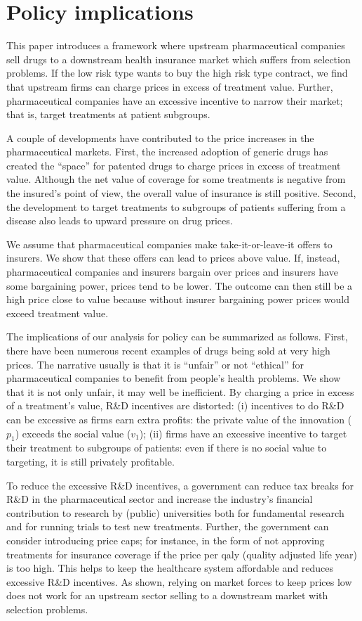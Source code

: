 \documentclass[a4paper,12pt]{article}
\begin{document}
\section{Policy implications}
\label{sec:orgf141759}

This paper introduces a framework where upstream pharmaceutical companies sell drugs to a downstream health insurance market which suffers from selection problems. If the low risk type wants to buy the high risk type contract, we find that upstream firms can charge prices in excess of treatment value. Further, pharmaceutical companies have an excessive incentive to narrow their market; that is, target treatments at patient subgroups.

A couple of developments have contributed to the price increases in the pharmaceutical markets. First, the increased adoption of generic drugs has created the ``space'' for patented drugs to charge prices in excess of treatment value. Although the net value of coverage for some treatments is negative from the insured's point of view, the overall value of insurance is still positive. Second, the development to target treatments to subgroups of patients suffering from a disease also leads to upward pressure on drug prices. 

We assume that pharmaceutical companies make take-it-or-leave-it offers to insurers. We show that these offers can lead to prices above value. If, instead, pharmaceutical companies and insurers bargain over prices and insurers have some bargaining power, prices tend to be lower. The outcome can then still be a high price close to value because without insurer bargaining power prices would exceed treatment value.

The implications of our analysis for policy can be summarized as follows. First, there have been numerous recent examples of drugs being sold at very high prices. The narrative usually is that it is ``unfair'' or not ``ethical'' for pharmaceutical companies to benefit from people's health problems. We show that it is not only unfair, it may well be inefficient. By charging a price in excess of a treatment's value, R\&D incentives are distorted: (i) incentives to do R\&D can be excessive as firms earn extra profits: the private value of the innovation (\(p_1\)) exceeds the social value (\(v_1\)); (ii) firms have an excessive incentive to target their treatment to subgroups of patients: even if there is no social value to targeting, it is still privately profitable.

To reduce the excessive R\&D incentives, a government can reduce tax breaks for R\&D in the pharmaceutical sector and increase the industry's financial contribution to research by (public) universities both for fundamental research and for running trials to test new treatments. Further, the government can consider introducing price caps; for instance, in the form of not approving treatments for insurance coverage if the price per qaly (quality adjusted life year) is too high. This helps to keep the healthcare system affordable and reduces excessive R\&D incentives. As shown, relying on market forces to keep prices low does not work for an upstream sector selling to a downstream market with selection problems.
\end{document}
